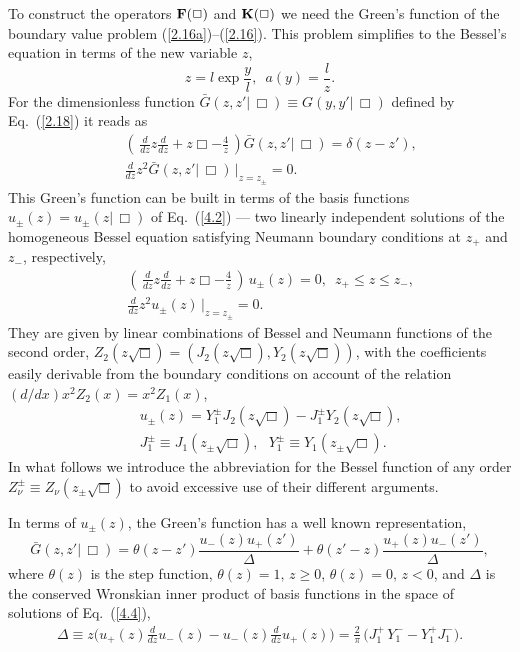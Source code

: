 \documentclass[a4paper,preprint,nofootinbib,
                 showpacs,preprintnumbers,amsmath,amssymb]{revtex4}
\begin{document}
To construct the operators ${\bf F}(\Box)$ and 
${\bf K}(\Box)$ we need the Green's function of the boundary value 
problem (\ref{2.16a})--(\ref{2.16}). This problem simplifies to 
the Bessel's equation in terms of the new variable $z$, 
    \begin{equation} 
    z=l\exp\frac yl,\,\,\,a(y)=\frac lz.    \label{4.1} 
    \end{equation} 
For the dimensionless function $\bar G(z,z'|\,\Box)\equiv 
G(y,y'|\,\Box)$ defined by Eq.~(\ref{2.18}) it reads as 
    \begin{eqnarray} 
    &&\left(\,\frac d{dz}z\frac d{dz} 
    +z\Box-\frac4z\,\right) 
    \bar G(z,z'|\,\Box)=\delta(z-z'),           \label{4.2} \\ 
    &&\frac d{dz}z^2\bar 
    G(z,z'|\,\Box)\,\Big|_{z=z_\pm}=0.        \label{4.3} 
    \end{eqnarray} 
This Green's function can be built in terms of the basis functions 
$u_\pm(z)=u_\pm(z|\,\Box)$ of Eq.~(\ref{4.2}) --- two linearly 
independent solutions of the homogeneous Bessel equation 
satisfying Neumann boundary conditions at $z_+$ and 
$z_-$, respectively, 
    \begin{eqnarray} 
    &&\left(\,\frac d{dz}z\frac d{dz} 
    +z\Box-\frac4z\,\right)\,u_\pm(z)=0,\,\,\, 
    z_+\leq z\leq z_-,                             \label{4.4} \\ 
    &&\frac d{dz}z^2 u_\pm(z)\,\Big|_{z=z_\pm}=0.  \label{4.5} 
    \end{eqnarray} 
They are given by linear combinations of Bessel and Neumann 
functions of the second order, 
$Z_2(z\sqrt\Box)=(J_2(z\sqrt\Box),Y_2(z\sqrt\Box))$, with the 
coefficients easily derivable from the boundary conditions on account 
of the relation $(d/dx)x^2 Z_2(x)=x^2 Z_1(x)$, 
    \begin{eqnarray} 
    &&u_\pm(z)=Y_1^\pm J_2(z\sqrt\Box) 
    -J_1^\pm Y_2(z\sqrt\Box),                        \label{4.6}\\ 
    &&J_1^\pm \equiv J_1(z_\pm\sqrt\Box),\,\,\,\, 
    Y_1^\pm \equiv Y_1(z_\pm\sqrt\Box). 
    \end{eqnarray} 
In what follows we introduce the abbreviation for the Bessel function of any 
order $Z_\nu^\pm\equiv Z_\nu(z_\pm\sqrt\Box)$ to avoid excessive use of their 
different arguments. 
 
In terms of $u_\pm(z)$, the Green's function has a well known representation, 
    \begin{equation} 
     \bar G(z,z'|\,\Box)=\theta(z-z') 
     \frac{u_-(z)u_+(z')}{\Delta}+ 
    \theta(z'-z)\frac{u_+(z)u_-(z')}{\Delta},              \label{4.7} 
    \end{equation} 
where $\theta(z)$ is the step function, $\theta(z)=1,\,z\geq 0$, 
$\theta(z)=0,\,z<0$, and $\Delta$ is the conserved Wronskian inner product 
of basis functions in the space of solutions of Eq.~(\ref{4.4}), 
    \begin{eqnarray} 
    \Delta\equiv z\Big(u_+(z)\frac d{dz}u_-(z) 
    -u_-(z)\frac d{dz}u_+(z)\Big)= 
    \frac2\pi\,\Big(J_1^+\,Y_1^--Y_1^+J_1^-\Big).  \label{4.8} 
    \end{eqnarray} 
 
\end{document}
